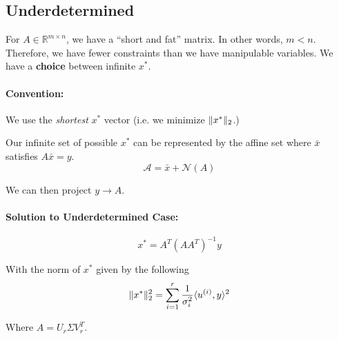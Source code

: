 \documentclass[a4paper,12pt]{report}
\DeclarePairedDelimiter\norm{\lVert}{\rVert}%
\DeclarePairedDelimiter\inpr{\langle}{\rangle}%
\begin{document}
\subsection{Underdetermined}

For $A\in \mathbb{R}^{m\times n}$, we have a ``short and fat'' matrix. In other words, $m < n$. Therefore, we have fewer constraints than we have manipulable variables. We have a \textbf{choice} between infinite $x^*$. 

\paragraph{Convention:} We use the \textit{shortest} $x^*$ vector (i.e. we minimize $\norm{x^*}_2$.)

Our infinite set of possible $x^*$ can be represented by the affine set where $\bar x$ satisfies $A\bar x = y$.
\begin{equation}
\mathcal{A} = \bar x + \mathcal{N}(A)
\end{equation}

We can then project $y\to A$.

\paragraph{Solution to Underdetermined Case: } 
\begin{equation}
x^* = A^T(AA^T)^{-1} y
\end{equation}

With the norm of $x^*$ given by the following
\begin{equation}
\norm{x^*}_2^2 = \sum_{i=1}^{r} \frac{1}{\sigma_i^2} \inpr{u^{(i)}, y}^2
\end{equation}

Where $A = U_r \Sigma V_r^T$. 
\end{document}
